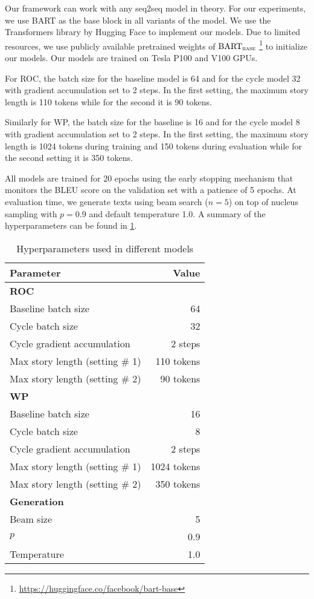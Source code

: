 Our framework can work with any seq2seq model in theory. For our experiments, we use BART as the base block in all variants of the model. We use the Transformers library by Hugging Face \citep{wolf2020transformers} to implement our models. Due to limited resources, we use publicly available pretrained weights of $\text{BART}_\textsc{base}$ \footnote{\url{https://huggingface.co/facebook/bart-base}} to initialize our models. Our models are trained on Tesla P100 and V100 GPUs.

For ROC, the batch size for the baseline model is 64 and for the cycle model 32 with gradient accumulation set to 2 steps. In the first setting, the maximum story length is 110 tokens while for the second it is 90 tokens.

Similarly for WP, the batch size for the baseline is 16 and for the cycle model 8 with gradient accumulation set to 2 steps. In the first setting, the maximum story length is 1024 tokens during training and 150 tokens during evaluation while for the second setting it is 350 tokens.

All models are trained for 20 epochs using the early stopping mechanism that monitors the BLEU score on the validation set with a patience of 5 epochs. At evaluation time, we generate texts using beam search ($n = 5$) on top of nucleus sampling \citep{holtzman2019curious} with $p = 0.9$ and default temperature 1.0. A summary of the hyperparameters can be found in \cref{tab:hyperparameters}.

\begin{table}[ht]
\centering
\begin{tabular}{l|r}
Parameter & Value \\ \hline
\multicolumn{2}{l}{\textbf{ROC}} \\
Baseline batch size & 64 \\
Cycle batch size & 32 \\
Cycle gradient accumulation & 2 steps \\
Max story length (setting \# 1) & 110 tokens \\
Max story length (setting \# 2) & 90 tokens \\ \hline
\multicolumn{2}{l}{\textbf{WP}} \\
Baseline batch size & 16 \\
Cycle batch size & 8 \\
Cycle gradient accumulation & 2 steps \\
Max story length (setting \# 1) & 1024 tokens \\
Max story length (setting \# 2) & 350 tokens \\ \hline
\multicolumn{2}{l}{\textbf{Generation}} \\
Beam size & 5 \\
$p$ & 0.9 \\
Temperature & 1.0 \\ \hline
\end{tabular}
\caption{Hyperparameters used in different models}
\label{tab:hyperparameters}
\end{table}

